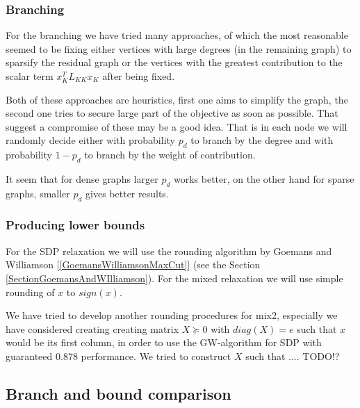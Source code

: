 \documentclass[12pt]{book}
\theoremstyle{definition}
\begin{document}
\subsubsection{Branching}
For the branching we have tried many approaches, of which the most reasonable seemed to be fixing either vertices with large degrees (in the remaining graph) to sparsify the residual graph or the vertices with the greatest contribution to the scalar term $x_K^TL_{KK}x_K$ after being fixed.

Both of these approaches are heuristics, first one aims to simplify the graph, the second one tries to secure large part of the objective as soon as possible. That suggest a compromise of these may be a good idea. That is in each node we will randomly decide either with probability $p_{d}$ to branch by the degree and with probability $1-p_d$ to branch by the weight of contribution.

It seem that for dense graphs larger $p_d$ works better, on the other hand for sparse graphs, smaller $p_d$ gives better results.

\subsubsection{Producing lower bounds}
For the SDP relaxation we will use the rounding algorithm by Goemans and Williamson [\ref{GoemansWilliamsonMaxCut}] (see the Section \ref{SectionGoemansAndWIlliamson}). For the mixed relaxation we will use simple rounding of $x$ to $sign(x)$.

\rem We have tried to develop another rounding procedures for mix2, especially we have considered creating creating matrix $X\succeq 0$ with $diag(X) = e$ such that $x$ would be its first column, in order to use the GW-algorithm for SDP with guaranteed 0.878 performance. We tried to construct $X$ such that .... TODO!?


\subsection{Branch and bound comparison}
\end{document}
